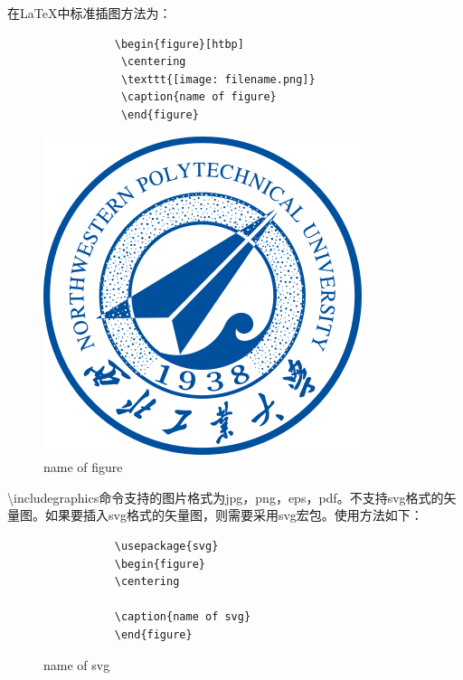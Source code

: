 \documentclass[12pt]{book}
\begin{document}
在\LaTeX{}中标准插图方法为：
\begin{figure}[htbp]
     \begin{minipage}{0.45\textwidth}
          \begin{verbatim}
           \begin{figure}[htbp]
            \centering
            \texttt{[image: filename.png]}
            \caption{name of figure}
            \end{figure}
          \end{verbatim}
     \end{minipage}
     \begin{minipage}{0.45\textwidth}
          \centering
          \includegraphics[scale=0.2]{logo.png}
          \caption{name of figure}
     \end{minipage}
\end{figure}

\textbackslash includegraphics命令支持的图片格式为jpg，png，eps，pdf。不支持svg格式的矢量图。如果要插入svg格式的矢量图，则需要采用svg宏包。使用方法如下：

\begin{figure}[htbp]
     \begin{minipage}{0.45\textwidth}
          \begin{verbatim}
           \usepackage{svg}
           \begin{figure}
           \centering
           
           \caption{name of svg}
           \end{figure}
          \end{verbatim}
     \end{minipage}
     \begin{minipage}{0.45\textwidth}
          \centering
          
          \caption{name of svg}
     \end{minipage}
\end{figure}
\end{document}
